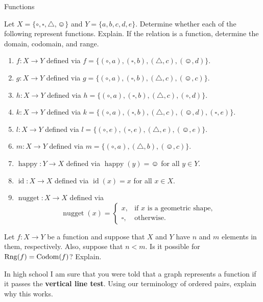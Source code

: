 \begin{section}{Functions}
\begin{exercise}\label{exer:lots}
Let \(X=\{\circ, \square,\triangle,\smiley\}\) and \(Y=\{a,b,c,d,e\}\).  Determine whether each of the following represent functions.  Explain.  If the relation is a function, determine the domain, codomain, and range.

\begin{enumerate}
\item \(f:X\to Y\) defined via \(f=\{(\circ, a),(\square,b),(\triangle,c),(\smiley,d)\}\).
\item \(g:X\to Y\) defined via \(g=\{(\circ, a),(\square,b),(\triangle,c),(\smiley,c)\}\).
\item \(h:X\to Y\) defined via \(h=\{(\circ, a),(\square,b),(\triangle,c),(\circ,d)\}\).
\item \(k:X\to Y\) defined via \(k=\{(\circ, a),(\square,b),(\triangle,c),(\smiley,d),(\square,e)\}\).
\item \(l:X\to Y\) defined via \(l=\{(\circ, e),(\square,e),(\triangle,e),(\smiley,e)\}\).
\item \(m:X\to Y\) defined via \(m=\{(\circ, a),(\triangle,b),(\smiley,c)\}\).
\item \(\operatorname{happy}:Y\to X\) defined via \(\operatorname{happy}(y)=\smiley\) for all \(y\in Y\).
\item \(\operatorname{id}:X\to X\) defined via \(\operatorname{id}(x)=x\) for all \(x\in X\).
\item \(\operatorname{nugget}:X\to X\) defined via 
\[
\operatorname{nugget}(x)=\begin{cases}
x, & \mbox{if } x\mbox{ is a geometric shape},\\
\square, & \mbox{otherwise}.
\end{cases}
\]
\end{enumerate}
\end{exercise}

\begin{exercise}
Let \(f:X\to Y\) be a function and suppose that \(X\) and \(Y\) have \(n\) and \(m\) elements in them, respectively.  Also, suppose that \(n<m\).  Is it possible for \(\operatorname{Rng}(f)=\operatorname{Codom}(f)\)?  Explain.
\end{exercise}

\begin{exercise}
In high school I am sure that you were told that a graph represents a function if it passes the \textbf{vertical line test}.  Using our terminology of ordered pairs, explain why this works.
\end{exercise}


\end{section}
